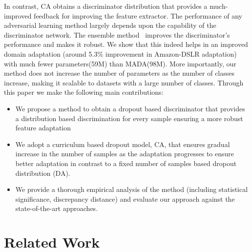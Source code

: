 \documentclass{bmvc2k}
\begin{document}
In contrast, CA obtains a discriminator distribution that provides a much-improved feedback for improving the feature extractor. The performance of any adversarial learning method largely depends upon the capability of the discriminator network. The ensemble method~\cite{hara2016analysis} improves the discriminator's performance and makes it robust. We show that this indeed helps in an improved domain adaptation (around 5.3\% improvement in Amazon-DSLR adaptation) with much fewer parameters(59M) than MADA(98M). More importantly, our method does not increase the number of parameters as the number of classes increase, making it scalable to datasets with a large number of classes. Through this paper we make the following main contributions:



\begin{itemize}
\item We propose a method to obtain a dropout based discriminator that provides a distribution based discrimination for every sample ensuring a more robust feature adaptation
\item We adopt a curriculum based dropout model, CA, that ensures gradual increase in the number of samples as the adaptation progresses to ensure better adaptation in contrast to a fixed number of samples based dropout distribution (DA).
\item We provide a thorough empirical analysis of the method (including statistical significance, discrepancy distance) and evaluate our approach against the state-of-the-art approaches.
\end{itemize}



















\section{Related Work}
\end{document}
